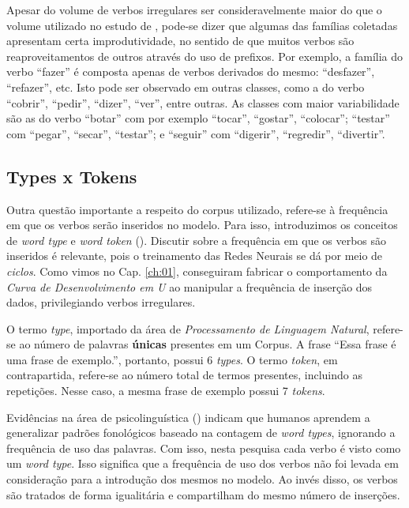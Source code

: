 Apesar do volume de verbos irregulares ser consideravelmente maior do que o volume utilizado no estudo de \cite{rumelhart:1986}, pode-se dizer que algumas das famílias coletadas apresentam certa improdutividade, no sentido de que muitos verbos são reaproveitamentos de outros através do uso de prefixos. Por exemplo, a família do verbo “fazer” é composta apenas de verbos derivados do mesmo: “desfazer”, “refazer”, etc. Isto pode ser observado em outras classes, como a do verbo “cobrir”, “pedir”, “dizer”, “ver”, entre outras. As classes com maior variabilidade são as do verbo “botar” com por exemplo “tocar”, “gostar”, “colocar”; “testar” com “pegar”, “secar”, “testar”; e “seguir” com “digerir”, “regredir”, “divertir”.   

\subsection{Types x Tokens}
Outra questão importante a respeito do corpus utilizado, refere-se à frequência em que os verbos serão inseridos no modelo. Para isso, introduzimos os conceitos de \textit{word type} e \textit{word token} (\cite{Manning:1999}). Discutir sobre a frequência em que os verbos são inseridos é relevante, pois o treinamento das Redes Neurais se dá por meio de \textit{ciclos}. Como vimos no Cap. \ref{ch:01}, \cite{rumelhart:1986} conseguiram fabricar o comportamento da \textit{Curva de Desenvolvimento em U} ao manipular a frequência de inserção dos dados, privilegiando verbos irregulares. 

O termo \textit{type}, importado da área de \textit{Processamento de Linguagem Natural}, refere-se ao número de palavras \textbf{únicas} presentes em um Corpus. A frase “Essa frase é uma frase de exemplo.”, portanto, possui 6 \textit{types}. O termo \textit{token}, em contrapartida, refere-se ao número total de termos presentes, incluindo as repetições. Nesse caso, a mesma frase de exemplo possui 7 \textit{tokens}. 

Evidências na área de psicolinguística (\cite{Bybee:1995,janet:2018}) indicam que humanos aprendem a generalizar padrões fonológicos baseado na contagem de \textit{word types}, ignorando a frequência de uso das palavras. Com isso, nesta pesquisa cada verbo é visto como um \textit{word type}. Isso significa que a frequência de uso dos verbos não foi levada em consideração para a introdução dos mesmos no modelo. Ao invés disso, os verbos são tratados de forma igualitária e compartilham do mesmo número de inserções.\\


